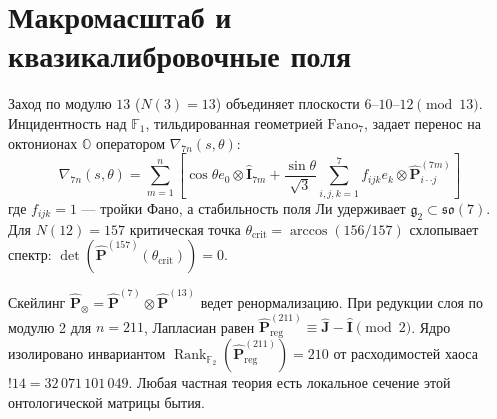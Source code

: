 \documentclass[10pt,twocolumn,fleqn]{article}
\DeclareMathOperator{\Rank}{Rank}
\begin{document}
\section{Макромасштаб и квазикалибровочные поля}
Заход по модулю $13$ ($N(3)=13$) объединяет плоскости $6\text{--}10\text{--}12 \pmod{13}$. Инцидентность над $\mathbb{F}_1$, тильдированная геометрией $\text{Fano}_7$, задает перенос на октонионах $\mathbb{O}$ оператором $\nabla_{7n}(s, \theta)$:
\begin{equation}
    \nabla_{7n}(s, \theta) = \sum_{m=1}^{n} \left[ \cos\theta e_0 \otimes \hat{\mathbf{I}}_{7m} + \frac{\sin\theta}{\sqrt{3}} \sum_{i,j,k=1}^{7} f_{ijk} e_k \otimes \hat{\mathbf{P}}^{(7m)}_{i\cdot\cdot j} \right]
\end{equation}
где $f_{ijk} = 1$ --- тройки Фано, а стабильность поля Ли удерживает $\mathfrak{g}_2 \subset \mathfrak{so}(7)$. Для $N(12)=157$ критическая точка $\theta_{\text{crit}} = \arccos(156/157)$ схлопывает спектр: $\det(\hat{\mathbf{P}}^{(157)}(\theta_{\text{crit}})) = 0$. 

Скейлинг $\hat{\mathbf{P}}_{\otimes} = \hat{\mathbf{P}}^{(7)} \otimes \hat{\mathbf{P}}^{(13)}$ ведет ренормализацию. При редукции слоя по модулю 2 для $n=211$, Лапласиан равен $\hat{\mathbf{P}}_{\text{reg}}^{(211)} \equiv \hat{\mathbf{J}} - \hat{\mathbf{I}} \pmod 2$. Ядро изолировано инвариантом $\Rank_{\mathbb{F}_2}(\hat{\mathbf{P}}_{\text{reg}}^{(211)}) = 210$ от расходимостей хаоса $!14 = 32\,071\,101\,049$. Любая частная теория есть локальное сечение этой онтологической матрицы бытия.
\end{document}
